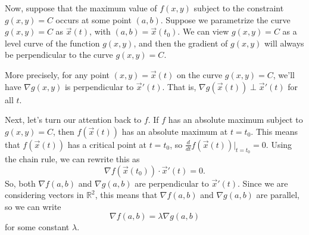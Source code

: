 \documentclass{ximera}
\begin{document}
Now, suppose that the maximum value of $f(x,y)$ subject to the constraint $g(x,y)=C$ occurs at some point $(a,b)$. Suppose we parametrize the curve $g(x,y)=C$ as $\vec{x}(t)$, with $(a,b)=\vec{x}(t_0)$. We can view $g(x,y)=C$ as a level curve of the function $g(x,y)$, and then the gradient of $g(x,y)$ will always be perpendicular to the curve $g(x,y)=C$.

\begin{image}
\end{image}

More precisely, for any point $(x,y) = \vec{x}(t)$ on the curve $g(x,y)=C$, we'll have $\nabla g(x,y)$ is perpendicular to $\vec{x}'(t)$. That is, $\nabla g(\vec{x}(t))\perp \vec{x}'(t)$ for all $t$.

\begin{image}
\end{image}

Next, let's turn our attention back to $f$. If $f$ has an absolute maximum subject to $g(x,y)=C$, then $f(\vec{x}(t))$ has an absolute maximum at $t=t_0$. This means that $f(\vec{x}(t))$ has a critical point at $t=t_0$, so $\frac{d}{dt}f(\vec{x}(t))|_{t=t_0}=0$. Using the chain rule, we can rewrite this as
\[
\nabla f(\vec{x}(t_0))\cdot \vec{x}'(t)=0.
\]
So, both $\nabla f(a,b)$ and $\nabla g(a,b)$ are perpendicular to $\vec{x}'(t)$. Since we are considering vectors in $\mathbb{R}^2$, this means that $\nabla f(a,b)$ and $\nabla g(a,b)$ are parallel, so we can write
\[
\nabla f(a,b) = \lambda \nabla g(a,b)
\]
for some constant $\lambda$.
\end{document}
